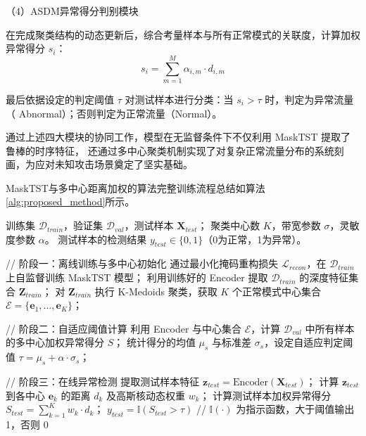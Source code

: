 

（4）ASDM异常得分判别模块

在完成聚类结构的动态更新后，综合考量样本与所有正常模式的关联度，计算加权异常得分 $s_i$：
\begin{equation}
    s_i = \sum_{m=1}^{M} \alpha_{i,m} \cdot d_{i,m}
\end{equation}

最后依据设定的判定阈值 $\tau$ 对测试样本进行分类：当 $s_i > \tau$ 时，判定为异常流量（
Abnormal）；否则判定为正常流量（Normal）。

通过上述四大模块的协同工作，模型在无监督条件下不仅利用 MaskTST 提取了鲁棒的时序特征，
还通过多中心聚类机制实现了对复杂正常流量分布的系统刻画，为应对未知攻击场景奠定了坚实基础。

MaskTST与多中心距离加权的算法完整训练流程总结如算法
\ref{alg:proposed_method}所示。

\begin{algorithm}[htbp]
\caption{基于 MaskTST 与多中心距离加权的异常流量检测算法}
\label{alg:proposed_method}
\begin{algorithmic}[1]
\REQUIRE 
    训练集 $\mathcal{D}_{train}$，验证集 $\mathcal{D}_{val}$，测试样本 $\mathbf{X}_{test}$；
    聚类中心数 $K$，带宽参数 $\sigma$，灵敏度参数 $\alpha$。
\ENSURE 
    测试样本的检测结果 $y_{test} \in \{0, 1\}$（0为正常，1为异常）。

\STATE // 阶段一：离线训练与多中心初始化
\STATE 通过最小化掩码重构损失 $\mathcal{L}_{recon}$，在 $\mathcal{D}_{train}$ 上自监督训练 MaskTST 模型；
\STATE 利用训练好的 Encoder 提取 $\mathcal{D}_{train}$ 的深度特征集合 $\mathbf{Z}_{train}$；
\STATE 对 $\mathbf{Z}_{train}$ 执行 K-Medoids 聚类，获取 $K$ 个正常模式中心集合 $\mathcal{E} = \{\mathbf{e}_1, \dots, \mathbf{e}_K\}$；

\STATE // 阶段二：自适应阈值计算
\STATE 利用 Encoder 与中心集合 $\mathcal{E}$，计算 $\mathcal{D}_{val}$ 中所有样本的多中心加权异常得分 $S$；
\STATE 统计得分的均值 $\mu_s$ 与标准差 $\sigma_s$，设定自适应判定阈值 $\tau = \mu_s + \alpha \cdot \sigma_s$；

\STATE // 阶段三：在线异常检测
\STATE 提取测试样本特征 $\mathbf{z}_{test} = \text{Encoder}(\mathbf{X}_{test})$；
\STATE 计算 $\mathbf{z}_{test}$ 到各中心 $\mathbf{e}_k$ 的距离 $d_k$ 及高斯核动态权重 $w_k$；
\STATE 计算测试样本加权异常得分 $S_{test} = \sum_{k=1}^K w_k \cdot d_k$；
\RETURN $y_{test} = \mathbb{I}(S_{test} > \tau)$ \quad // $\mathbb{I}(\cdot)$ 为指示函数，大于阈值输出 1，否则 0
\end{algorithmic}
\end{algorithm}

